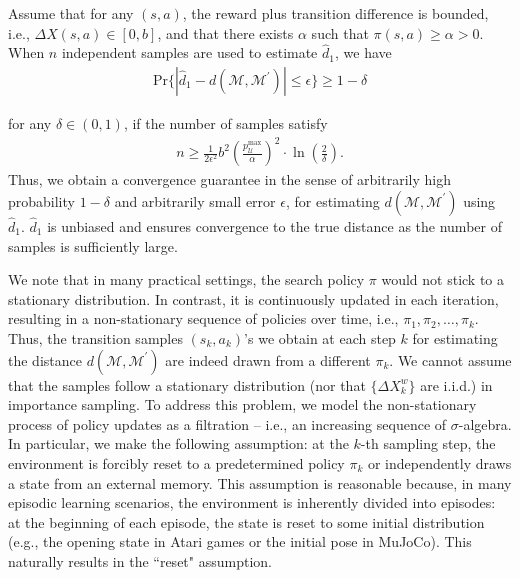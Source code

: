 \begin{theorem}
\label{the:err_signal_policy}
Assume that for any $(s, a)$, the reward plus transition difference is bounded, i.e., $\Delta X(s, a) \in [0, b]$, and that there exists $\alpha$ such that $\pi(s, a) \geq \alpha > 0$.
When $n$ independent samples are used to estimate $\hat{d}_{1}$, we have
\begin{equation}
\begin{aligned}
\text{Pr}\{|\hat{d}_{1}-d(\mathcal{M},\mathcal{M}^{\prime})|\leq \epsilon\} \geq 1-\delta
\end{aligned}
\end{equation}
\end{theorem}
for any $\delta \in (0, 1)$, if the number of samples satisfy
\begin{equation}
\begin{aligned}
    n \geq \frac{1}{2\epsilon^2} b^2\left(\frac{p_\mathcal{U}^{\max}}{\alpha}\right)^2 \cdot \ln\left(\frac{2}{\delta}\right).
\end{aligned}
\end{equation}
Thus, we obtain a convergence guarantee in the sense of arbitrarily high probability $1-\delta$ and arbitrarily small error $\epsilon$, for estimating $d(\mathcal{M},\mathcal{M}^{\prime})$ using $\hat{d}_{1}$. $\hat{d}_{1}$ is unbiased and ensures convergence to the true distance as the number of samples is sufficiently large.

We note that in many practical settings, the search policy $\pi$ would not stick to a stationary distribution. In contrast, it is continuously updated in each iteration, resulting in a non-stationary sequence of policies over time, i.e., $\pi_1, \pi_2, \dots, \pi_k$. Thus, the transition samples $(s_k, a_k)$'s we obtain at each step $k$ for estimating the distance $d(\mathcal{M},\mathcal{M}^{\prime})$ are indeed drawn from a different $\pi_k$. We cannot assume that the samples follow a stationary distribution (nor that $\{\Delta X^w_k\}$ are i.i.d.) in importance sampling. To address this problem, we model the non-stationary process of policy updates as a filtration – i.e., an increasing sequence of $\sigma$-algebra. In particular, we make the following assumption: at the $k$-th sampling step, the environment is forcibly reset to a predetermined policy $\pi_k$ or independently draws a state from an external memory. This assumption is reasonable because, in many episodic learning scenarios, the environment is inherently divided into episodes: at the beginning of each episode, the state is reset to some initial distribution (e.g., the opening state in Atari games or the initial pose in MuJoCo). This naturally results in the ``reset" assumption. 

